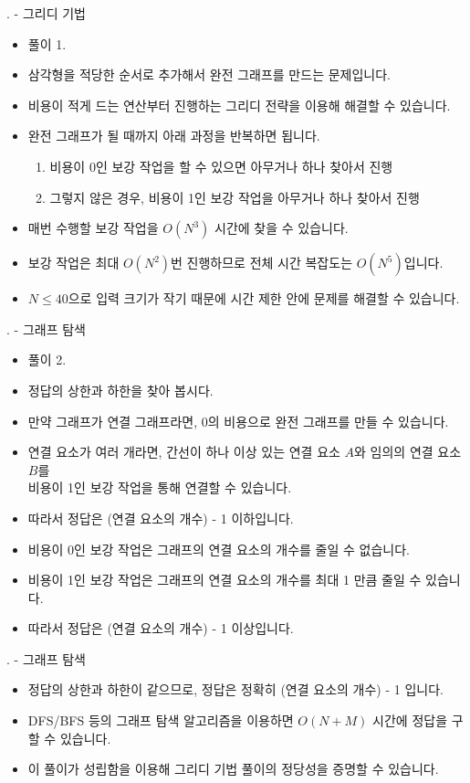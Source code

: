 \begin{frame}{\probno{}. \probtitle{} - 그리디 기법}
    \begin{itemize}
        \item 풀이 1.
        \item 삼각형을 적당한 순서로 추가해서 완전 그래프를 만드는 문제입니다.
        \item 비용이 적게 드는 연산부터 진행하는 그리디 전략을 이용해 해결할 수 있습니다.
        \item 완전 그래프가 될 때까지 아래 과정을 반복하면 됩니다.

        \begin{enumerate}
            \item 비용이 0인 보강 작업을 할 수 있으면 아무거나 하나 찾아서 진행
            \item 그렇지 않은 경우, 비용이 1인 보강 작업을 아무거나 하나 찾아서 진행
        \end{enumerate}

        \item 매번 수행할 보강 작업을 $O(N^3)$ 시간에 찾을 수 있습니다.
        \item 보강 작업은 최대 $O(N^2)$번 진행하므로 전체 시간 복잡도는 $O(N^5)$입니다.
        \item $N \leq 40$으로 입력 크기가 작기 때문에 시간 제한 안에 문제를 해결할 수 있습니다.
    \end{itemize}
\end{frame}

\begin{frame}{\probno{}. \probtitle{} - 그래프 탐색}
    \begin{itemize}
        \item 풀이 2.
        \item 정답의 상한과 하한을 찾아 봅시다.
        \vspace{3mm}
        \item 만약 그래프가 연결 그래프라면, 0의 비용으로 완전 그래프를 만들 수 있습니다.
        \item 연결 요소가 여러 개라면, 간선이 하나 이상 있는 연결 요소 $A$와 임의의 연결 요소 $B$를\\
        비용이 1인 보강 작업을 통해 연결할 수 있습니다.
        \item 따라서 정답은 (연결 요소의 개수) - 1 이하입니다.
        \vspace{3mm}
        \item 비용이 0인 보강 작업은 그래프의 연결 요소의 개수를 줄일 수 없습니다.
        \item 비용이 1인 보강 작업은 그래프의 연결 요소의 개수를 최대 1 만큼 줄일 수 있습니다.
        \item 따라서 정답은 (연결 요소의 개수) - 1 이상입니다.
    \end{itemize}
\end{frame}

\begin{frame}{\probno{}. \probtitle{} - 그래프 탐색}
    \begin{itemize}
        \item 정답의 상한과 하한이 같으므로, 정답은 정확히 (연결 요소의 개수) - 1 입니다.
        \item DFS/BFS 등의 그래프 탐색 알고리즘을 이용하면 $O(N+M)$ 시간에 정답을 구할 수 있습니다.
        \item 이 풀이가 성립함을 이용해 그리디 기법 풀이의 정당성을 증명할 수 있습니다.
    \end{itemize}
\end{frame}